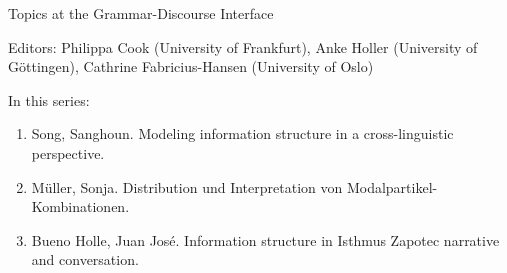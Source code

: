 {\large  Topics at the Grammar-Discourse Interface}

\bigskip

Editors: Philippa Cook (University of Frankfurt),
Anke Holler (University of Göttingen),
Cathrine Fabricius-Hansen (University of Oslo)

\bigskip

In this series:

\begin{enumerate}
\item Song, Sanghoun. Modeling information structure in a cross-linguistic perspective.
\item Müller, Sonja. Distribution und Interpretation von Modalpartikel-Kombinationen.
\item Bueno Holle, Juan José. Information structure in Isthmus Zapotec narrative and conversation.
\end{enumerate}

 
